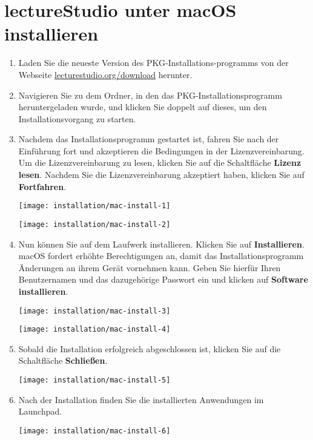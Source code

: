  \section{lectureStudio unter macOS installieren}
 \begin{enumerate}
	\item Laden Sie die neueste Version des \lectStudio{} PKG-Installations-programms von der Webseite \href{https://www.lecturestudio.org/download}{lecturestudio.org/download} herunter.
	\item Navigieren Sie zu dem Ordner, in den das PKG-Installationsprogramm heruntergeladen wurde, und klicken Sie doppelt auf dieses, um den Installationsvorgang zu starten.
	\item Nachdem das Installationsprogramm gestartet ist, fahren Sie nach der Einführung fort und akzeptieren die Bedingungen in der Lizenzvereinbarung. Um die Lizenzvereinbarung zu lesen, klicken Sie auf die Schaltfläche \textbf{Lizenz lesen}. Nachdem Sie die Lizenzvereinbarung akzeptiert haben, klicken Sie auf \textbf{Fortfahren}.

	\begin{minipage}[t][][b]{0.46\textwidth}
		\texttt{[image: installation/mac-install-1]}
	\end{minipage}
	\begin{minipage}[t][][b]{0.46\textwidth}
		\texttt{[image: installation/mac-install-2]}
	\end{minipage}

	\item Nun können Sie \lectStudio{} auf dem Laufwerk installieren. Klicken Sie auf \textbf{Installieren}. macOS fordert erhöhte Berechtigungen an, damit das Installationsprogramm Änderungen an ihrem Gerät vornehmen kann. Geben Sie hierfür Ihren Benutzernamen und das dazugehörige Passwort ein und klicken auf \textbf{Software installieren}.
	
	\begin{minipage}[t][][b]{0.46\textwidth}
		\texttt{[image: installation/mac-install-3]}
	\end{minipage}
	\begin{minipage}[t][][b]{0.46\textwidth}
		\texttt{[image: installation/mac-install-4]}
	\end{minipage}

	\item Sobald die Installation erfolgreich abgeschlossen ist, klicken Sie auf die Schaltfläche \textbf{Schließen}.

	\begin{minipage}{0.6\textwidth}
		\texttt{[image: installation/mac-install-5]}
	\end{minipage}

	\item Nach der Installation finden Sie die installierten Anwendungen im Launchpad.

	\begin{minipage}[t][][b]{0.46\textwidth}
		\texttt{[image: installation/mac-install-6]}
	\end{minipage}
\end{enumerate}